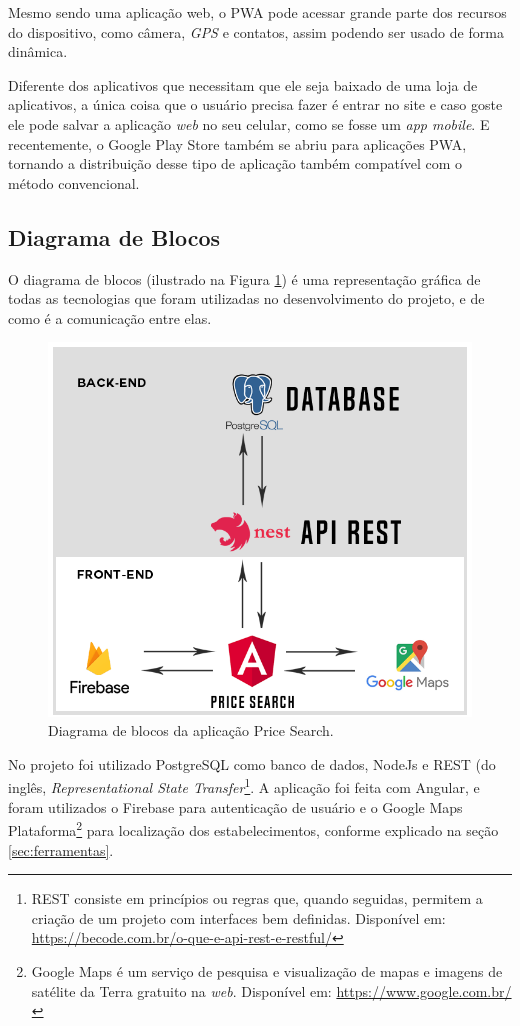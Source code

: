 Mesmo sendo uma aplicação web, o PWA pode acessar grande parte dos recursos do dispositivo, como câmera, \textit{GPS} e contatos, assim podendo ser usado de forma dinâmica.

Diferente dos aplicativos que necessitam que ele seja baixado de uma loja de aplicativos, a única coisa que o usuário precisa fazer é entrar no site e caso goste ele pode salvar a aplicação \textit{web} no seu celular, como se fosse um \textit{app mobile}. E recentemente, o Google Play Store também se abriu para aplicações PWA, tornando a distribuição desse tipo de aplicação também compatível com o método convencional.


\subsection{Diagrama de Blocos}

 O diagrama de blocos (ilustrado na Figura  \ref{fig:diagrama_de_blocos}) é uma representação gráfica de todas as tecnologias que foram utilizadas no desenvolvimento do projeto, e de como é a comunicação entre elas.
 
\begin{figure}[!htb]
\centering
\includegraphics[width=\linewidth]{figuras/diagrama_de_blocos.png}
\caption{Diagrama de blocos da aplicação Price Search.}
\label{fig:diagrama_de_blocos}
\end{figure}
 
 No projeto foi utilizado PostgreSQL como banco de dados, NodeJs e REST (do inglês, \textit{Representational State Transfer}\footnote{REST consiste em princípios ou regras que, quando seguidas, permitem a criação de um projeto com interfaces bem definidas. Disponível em: \url{https://becode.com.br/o-que-e-api-rest-e-restful/}}. A aplicação foi feita com Angular, e foram utilizados o Firebase para autenticação de usuário e o Google Maps Plataforma\footnote{Google Maps é um serviço de pesquisa e visualização de mapas e imagens de satélite da Terra gratuito na \textit{web}. Disponível em: \url{https://www.google.com.br/}} para localização dos estabelecimentos, conforme explicado na seção \ref{sec:ferramentas}.
 

